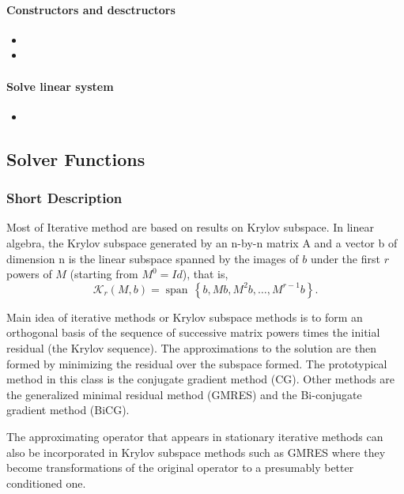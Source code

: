 \paragraph{Constructors and desctructors}
\begin{itemize}
\item {}
\item {}
\end{itemize}
\paragraph{Solve linear system}
\begin{itemize}
\item {}
\end{itemize}


\subsection{Solver Functions}
\subsubsection{Short Description}
Most of Iterative method are based on results on Krylov subspace. In linear algebra, the Krylov subspace generated by an n-by-n matrix A and a
vector b of dimension n is the linear subspace spanned by the images of $b$
under the first $r$ powers of $M$ (starting from $M^0 = Id$), that is, 
$$  \mathcal{K}_r(M, b) = \operatorname{span} \, \left\{ b, M b, M^2b, \ldots, M^{r-1}b\right\}.$$ 

Main idea of iterative methods or Krylov subspace methods is to form an
orthogonal basis of the sequence of successive matrix powers times the initial
residual (the Krylov sequence). The approximations to the solution are then
formed by minimizing the residual over the subspace formed.
The prototypical method in this class is the conjugate gradient method (CG). Other methods are the generalized minimal residual method (GMRES) and the Bi-conjugate gradient method (BiCG).

The approximating operator that appears in stationary iterative methods can
also be incorporated in Krylov subspace methods such as GMRES where they
become transformations of the original operator
to a presumably better conditioned one.

